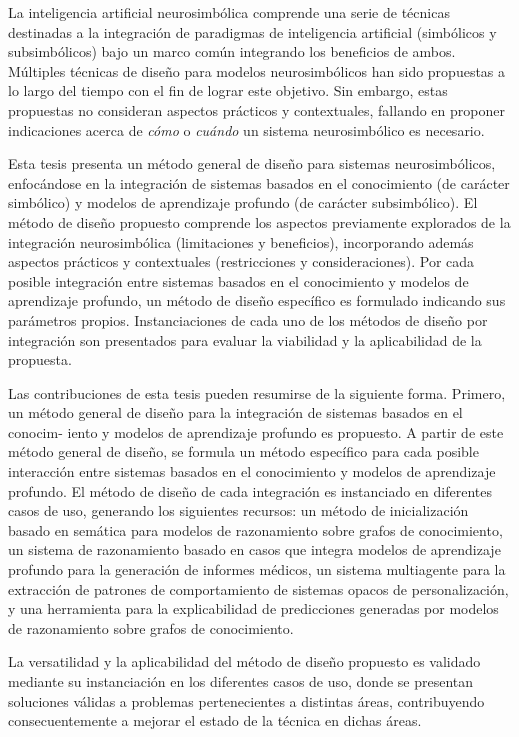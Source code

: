 \cleardoublepage
\begin{abstractslongSpanish}
La inteligencia artificial neurosimbólica comprende una serie de técnicas destinadas a la integración de paradigmas de inteligencia artificial (simbólicos y subsimbólicos) bajo un marco común integrando los beneficios de ambos. Múltiples técnicas de diseño para modelos neurosimbólicos han sido propuestas a lo largo del tiempo con el fin de lograr este objetivo. Sin embargo, estas propuestas no consideran aspectos prácticos y contextuales, fallando en proponer indicaciones acerca de \textit{cómo} o \textit{cuándo} un sistema neurosimbólico es necesario. 

Esta tesis presenta un método general de diseño para sistemas neurosimbólicos, enfocándose en la integración de sistemas basados en el conocimiento (de carácter simbólico) y modelos de aprendizaje profundo (de carácter subsimbólico). El método de diseño propuesto comprende los aspectos previamente explorados de la integración neurosimbólica (limitaciones y beneficios), incorporando además aspectos prácticos y contextuales (restricciones y consideraciones). Por cada posible integración entre sistemas basados en el conocimiento y modelos de aprendizaje profundo, un método de diseño específico es formulado indicando sus parámetros propios. Instanciaciones de cada uno de los métodos de diseño por integración son presentados para evaluar la viabilidad y la aplicabilidad de la propuesta.

Las contribuciones de esta tesis pueden resumirse de la siguiente forma. Primero, un método general de diseño para la integración de sistemas basados en el conocim-
iento y modelos de aprendizaje profundo es propuesto. A partir de este método general de diseño, se formula un método específico para cada posible interacción entre sistemas basados en el conocimiento y modelos de aprendizaje profundo. El método de diseño de cada integración es instanciado en diferentes casos de uso, generando los siguientes recursos: un método de inicialización basado en semática para modelos de razonamiento sobre grafos de conocimiento, un sistema de razonamiento basado en casos que integra modelos de aprendizaje profundo para la generación de informes médicos, un sistema multiagente para la extracción de patrones de comportamiento de sistemas opacos de personalización, y una herramienta para la explicabilidad de predicciones generadas por modelos de razonamiento sobre grafos de conocimiento.

La versatilidad y la aplicabilidad del método de diseño propuesto es validado mediante su instanciación en los diferentes casos de uso, donde se presentan soluciones válidas a problemas pertenecientes a distintas áreas, contribuyendo consecuentemente a mejorar el estado de la técnica en dichas áreas.


\end{abstractslongSpanish}
